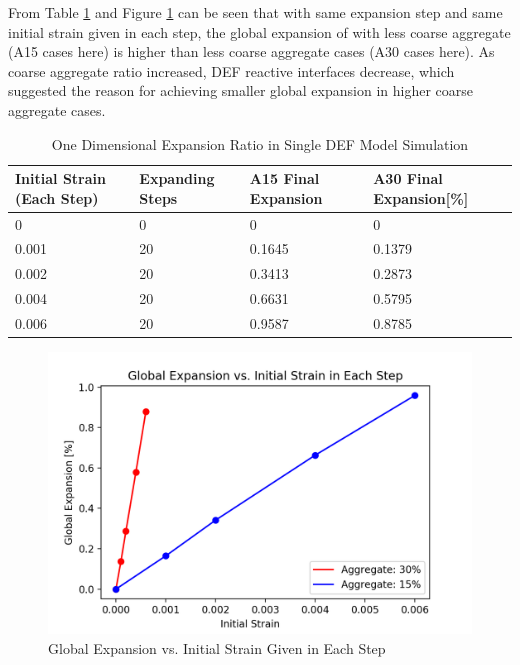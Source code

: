 From Table \ref{table:DEF_15vs30_EXP} and Figure \ref{fig:DEFA30vsA15_esdfsdfxp} can be seen that with same expansion step and same initial strain given in each step, the global expansion of with less coarse aggregate (A15 cases here) is higher than less coarse aggregate cases (A30 cases here).  As coarse aggregate ratio increased, DEF reactive interfaces decrease, which suggested the reason for achieving smaller global expansion in higher coarse aggregate cases.

\begin{table}[ht!]
  \caption{One Dimensional Expansion Ratio in Single DEF Model Simulation}
\centering
\begin{tabular}{ ||p{2cm}|p{2cm}|p{2cm}|p{2cm}|| }
 \hline
    Initial Strain (Each Step) & Expanding Steps & A15 Final Expansion & A30 Final Expansion[\%] \\ [0.5ex]
 \hline\hline
  0 & 0 & 0 & 0 \\
  0.001 & 20 & 0.1645 & 0.1379\\
  0.002 & 20 & 0.3413 & 0.2873\\
  0.004 & 20 & 0.6631 & 0.5795\\
  0.006 & 20 & 0.9587 & 0.8785\\
 \hline
\end{tabular}

\label{table:DEF_15vs30_EXP}
\end{table}

\begin{figure}[ht!]
\centering
\includegraphics[width=.8\linewidth]{Files/exp_plot/DEFA30vsA15_exp.png}
  \caption{Global Expansion vs. Initial Strain Given in Each Step}
  \label{fig:DEFA30vsA15_esdfsdfxp}
\end{figure}

\clearpage

